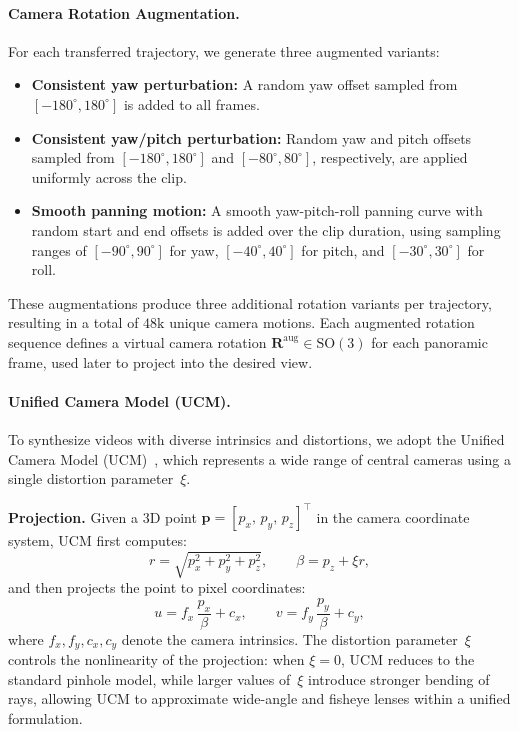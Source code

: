 \paragraph{Camera Rotation Augmentation.}
For each transferred trajectory, we generate three augmented variants:
\begin{itemize}
    \item \textbf{Consistent yaw perturbation:} A random yaw offset sampled from \([-180^\circ,180^\circ]\) is added to all frames.
    \item \textbf{Consistent yaw/pitch perturbation:} Random yaw and pitch offsets sampled from \([-180^\circ,180^\circ]\) and \([-80^\circ,80^\circ]\), respectively, are applied uniformly across the clip.
    \item \textbf{Smooth panning motion:} A smooth yaw-pitch-roll panning curve with random start and end offsets is added over the clip duration, using sampling ranges of \([-90^\circ,90^\circ]\) for yaw, \([-40^\circ,40^\circ]\) for pitch, and \([-30^\circ,30^\circ]\) for roll.
\end{itemize}
These augmentations produce three additional rotation variants per trajectory, resulting in a total of \(48\mathrm{k}\) unique camera motions.
Each augmented rotation sequence defines a virtual camera rotation \(\mathbf{R}^{\mathrm{aug}}\in\mathrm{SO}(3)\) for each panoramic frame, used later to project into the desired view.

\paragraph{Unified Camera Model (UCM).}
To synthesize videos with diverse intrinsics and distortions, we adopt the Unified Camera Model (UCM)~\cite{mei2007single}, which represents a wide range of central cameras using a single distortion parameter~\(\xi\).

\textbf{Projection.}
Given a 3D point
\(\bm{p} = [p_x,\, p_y,\, p_z]^\top\)
in the camera coordinate system, UCM first computes:
\begin{equation}
r = \sqrt{p_x^{2} + p_y^{2} + p_z^{2}},
\qquad
\beta = p_z + \xi r,
\label{eq:ucm_r_gamma}
\end{equation}
and then projects the point to pixel coordinates:
\begin{equation}
u = f_x\,\frac{p_x}{\beta} + c_x,
\qquad
v = f_y\,\frac{p_y}{\beta} + c_y,
\label{eq:ucm_projection}
\end{equation}
where \(f_x, f_y, c_x, c_y\) denote the camera intrinsics.
The distortion parameter~\(\xi\) controls the nonlinearity of the projection:
when \(\xi = 0\), UCM reduces to the standard pinhole model,
while larger values of~\(\xi\) introduce stronger bending of rays,
allowing UCM to approximate wide-angle and fisheye lenses within a unified formulation.

